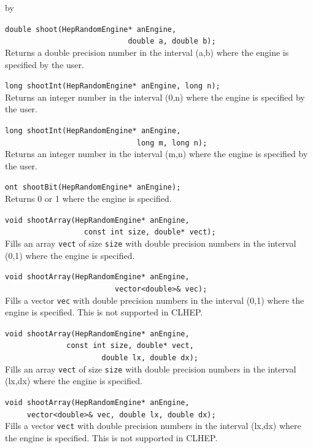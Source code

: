 \documentclass[twoside]{article}
\newcommand{\comp}[1]{\texttt{#1}}%
\newcommand{\entrylabel}[1]{\mbox{\textbf{{#1}}}\hfil}%
\newenvironment{entry}
{\begin{list}{}%
    {\renewcommand{\makelabel}{\entrylabel}%
     \setlength{\labelwidth}{90pt}%
     \setlength{\leftmargin}{\labelwidth}
     \advance\leftmargin by \labelsep%
      }%
    }%
  {\end{list}}
\newcommand{\Entrylabel}[1]%
{\raisebox{0pt}[1ex][0pt]{\makebox[\labelwidth][l]%
    {\parbox[t]{\labelwidth}{\hspace{0pt}\textbf{{#1}}}}}}
\newenvironment{Entry}%
{\renewcommand{\entrylabel}{\Entrylabel}\begin{entry}}%
  {\end{entry}}
\begin{document}
\begin{description}
\begin{Entry}
    \verb+double shoot(HepRandomEngine* anEngine,+\\
    \verb+                            double a, double b);+\\
    Returns a double precision number in the interval (a,b)
    where the engine is specified by the user.
    
    \verb+long shootInt(HepRandomEngine* anEngine, long n);+\\
    Returns an integer number in the interval (0,n)
    where the engine is specified by the user.
    
    \verb+long shootInt(HepRandomEngine* anEngine,+\\
    \verb+                              long m, long n);+\\
    Returns an integer number in the interval (m,n)
    where the engine is specified by the user.
    
    \verb+ont shootBit(HepRandomEngine* anEngine);+\\
    Returns 0 or 1 where the engine is specified.
    
    \verb+void shootArray(HepRandomEngine* anEngine,+\\
    \verb+                  const int size, double* vect);+\\
    Fills an array \comp{vect} of size \comp{size} with double
    precision numbers in the interval (0,1) where the engine is
    specified.

    \verb+void shootArray(HepRandomEngine* anEngine,+\\
    \verb+                         vector<double>& vec);+\\
    Fills a vector \comp{vec} with double
    precision numbers in the interval (0,1) where the engine is
    specified.  This is not supported in CLHEP.
    
   \verb+void shootArray(HepRandomEngine* anEngine,+\\ 
   \verb+              const int size, double* vect,+\\
   \verb+                      double lx, double dx);+\\
   Fills an array \comp{vect} of size \comp{size} with double
   precision numbers in the interval (lx,dx) where the engine is
   specified.

   \verb+void shootArray(HepRandomEngine* anEngine,+\\ 
   \verb+     vector<double>& vec, double lx, double dx);+\\
   Fills a vector \comp{vect} with double
   precision numbers in the interval (lx,dx) where the engine is
   specified.  This is not supported in CLHEP.
   

\end{Entry}
\end{description}
\end{document}
